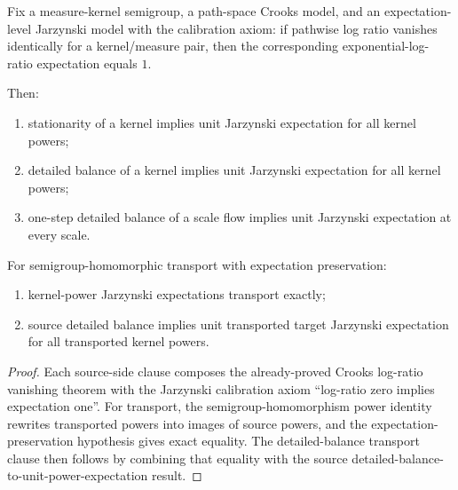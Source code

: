 \begin{theorem}\label{thm:path-space-jarzynski-kernel-power-transport}
Fix a measure-kernel semigroup, a path-space Crooks model, and an expectation-level Jarzynski model with the calibration axiom: if pathwise log ratio vanishes identically for a kernel/measure pair, then the corresponding exponential-log-ratio expectation equals $1$.

Then:
\begin{enumerate}
\item stationarity of a kernel implies unit Jarzynski expectation for all kernel powers;
\item detailed balance of a kernel implies unit Jarzynski expectation for all kernel powers;
\item one-step detailed balance of a scale flow implies unit Jarzynski expectation at every scale.
\end{enumerate}

For semigroup-homomorphic transport with expectation preservation:
\begin{enumerate}
\item kernel-power Jarzynski expectations transport exactly;
\item source detailed balance implies unit transported target Jarzynski expectation for all transported kernel powers.
\end{enumerate}
\end{theorem}

\begin{proof}
Each source-side clause composes the already-proved Crooks log-ratio vanishing theorem with the Jarzynski calibration axiom ``log-ratio zero implies expectation one''. For transport, the semigroup-homomorphism power identity rewrites transported powers into images of source powers, and the expectation-preservation hypothesis gives exact equality. The detailed-balance transport clause then follows by combining that equality with the source detailed-balance-to-unit-power-expectation result.
\end{proof}

